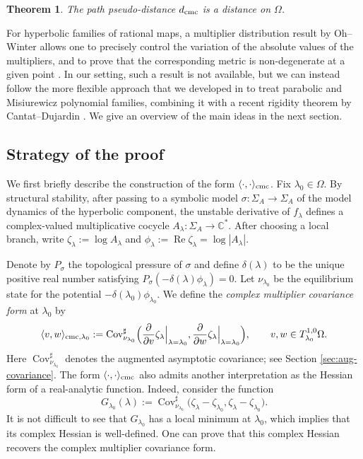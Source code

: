 \documentclass[11pt]{amsart}
\theoremstyle{plain}
\newtheorem{thm}{Theorem}[section]
\theoremstyle{definition}
\theoremstyle{remark}
\begin{document}
\begin{thm}\label{thm:path-metric}
The path pseudo-distance $d_{\rm cmc}$
is a distance on $\Omega$.
\end{thm}


For hyperbolic families of rational maps,
a multiplier distribution result by Oh--Winter 
\cite{OW17}
allows one to precisely control the variation of the absolute values of the multipliers, and to prove that the corresponding metric is non-degenerate at a given point \cite{HeNie23}. 
In our setting, such a result is not available,
but we can instead
follow the more flexible
approach that we developed
in  \cite{BH24,BH25} to treat
parabolic and Misiurewicz polynomial families, combining it with 
a recent rigidity theorem by Cantat--Dujardin \cite{CD26Henon}. We give an overview of the main ideas in the next section.
 

\subsection{Strategy of the proof}\label{sec:strategy-pf}
We first briefly describe the construction of the form $\langle\cdot, \cdot\rangle_{\rm cmc}$. 
Fix $\lambda_0\in\Omega$. By structural stability, after passing to a symbolic model $\sigma\colon \Sigma_A\to\Sigma_A$ of the model dynamics of the hyperbolic component, the unstable derivative of $f_\lambda$ defines a complex-valued multiplicative cocycle $A_\lambda\colon \Sigma_A\to\mathbb C^\ast$. After choosing a local branch, write $\zeta_\lambda:=\log A_\lambda$ and
$\phi_\lambda:=\operatorname{Re}\zeta_\lambda=\log |A_\lambda|$.

Denote by $P_{\sigma}$ the topological pressure of $\sigma$ and define $\delta(\lambda)$ to be the unique positive real number satisfying $P_\sigma(-\delta(\lambda)\phi_\lambda) = 0$. Let $\nu_{\lambda_0}$ be the equilibrium state for the potential $-\delta(\lambda_0)\phi_{\lambda_0}$. 
We define the {\it complex multiplier covariance form} at $\lambda_0$
by
$$\langle v,w\rangle_{\mathrm{cmc},\lambda_0}
:= \operatorname{Cov}^{\sharp}_{\nu_{\lambda_0}} \Bigl(
\frac{\partial}{\partial v} \zeta_\lambda \Big|_{\lambda=\lambda_0},
\frac{\partial}{\partial w} \zeta_\lambda \Big|_{\lambda=\lambda_0}
\Bigr), \qquad v,w\in T_{\lambda_0}^{1,0}\Omega.$$
Here $\operatorname{Cov}_{\nu_{\lambda_0}}^{\sharp}$ denotes the augmented asymptotic covariance; see Section \ref{sec:aug-covariance}. 
The form $\langle \cdot, \cdot\rangle_{\rm cmc}$
also 
admits another interpretation as the Hessian form of a real-analytic function. Indeed,
consider the function 
$$G_{\lambda_0}(\lambda) := \operatorname{Cov}^{\sharp}_{\nu_{\lambda_0}} \bigl(\zeta_\lambda-\zeta_{\lambda_0}, \zeta_\lambda-\zeta_{\lambda_0}\bigr).$$
It is not difficult to see that 
$G_{\lambda_0}$
has a local minimum at $\lambda_0$,
which implies that its complex Hessian is well-defined.
One can prove that this complex Hessian recovers the complex multiplier
covariance form.
\end{document}
